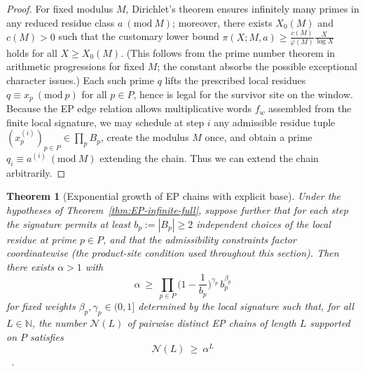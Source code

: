 \documentclass[12pt]{article}
\newtheorem{theorem}{Theorem}[section]
\numberwithin{equation}{section}
\newcommand{\N}{\mathbb{N}}
\begin{document}
\begin{proof}
For fixed modulus $M$, Dirichlet's theorem ensures infinitely many primes in any reduced residue class $a\ (\mathrm{mod}\ M)$; moreover, there exists $X_0(M)$ and $c(M)>0$ such that the customary lower bound $\pi(X;M,a)\ge \frac{c(M)}{\varphi(M)}\frac{X}{\log X}$ holds for all $X\ge X_0(M)$. (This follows from the prime number theorem in arithmetic progressions for fixed $M$; the constant absorbs the possible exceptional character issues.) Each such prime $q$ lifts the prescribed local residues $q\equiv x_p\ (\mathrm{mod}\ p)$ for all $p\in P$, hence is legal for the survivor site on the window. Because the EP edge relation allows multiplicative words $f_w$ assembled from the finite local signature, we may schedule at step $i$ any admissible residue tuple $(x^{(i)}_p)_{p\in P}\in \prod_p B_p$, create the modulus $M$ once, and obtain a prime $q_i\equiv a^{(i)}\ (\mathrm{mod}\ M)$ extending the chain. Thus we can extend the chain arbitrarily. 
\end{proof}

\begin{theorem}[Exponential growth of EP chains with explicit base]\label{thm:EP-explicit-growth}
Under the hypotheses of Theorem~\ref{thm:EP-infinite-full}, suppose further that for each step the signature permits at least $b_p:=|B_p|\ge 2$ independent choices of the local residue at prime $p\in P$, and that the admissibility constraints factor coordinatewise (the product-site condition used throughout this section). Then there exists $\alpha>1$ with
\[
\alpha\ \ge\ \prod_{p\in P}\Big(1-\frac{1}{b_p}\Big)^{\gamma_p}\,b_p^{\beta_p}
\]
for fixed weights $\beta_p,\gamma_p\in(0,1]$ determined by the local signature such that, for all $L\in\N$, the number $\mathcal{N}(L)$ of pairwise distinct EP chains of length $L$ supported on $P$ satisfies
\[
\mathcal{N}(L)\ \ge\ \alpha^L
\]
~\cite{SpivackUGPFormalization,ugp-lean}.
\end{theorem}
\end{document}
